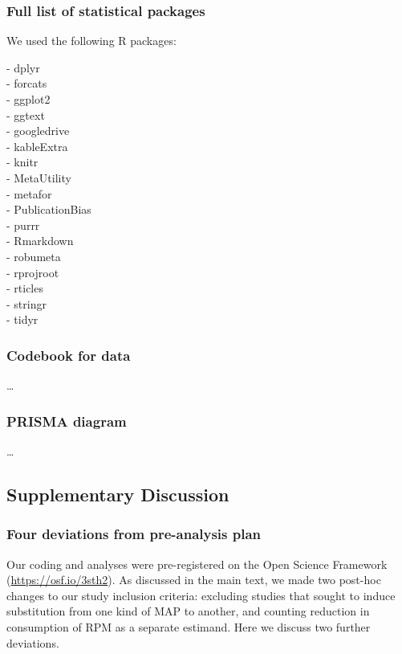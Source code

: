 \documentclass[sn-nature,referee,pdflatex]{sn-jnl}
\begin{document}
\subsubsection{Full list of statistical
packages}\label{full-list-of-statistical-packages}

We used the following R packages:

- dplyr\\
- forcats\\
- ggplot2\\
- ggtext\\
- googledrive\\
- kableExtra\\
- knitr\\
- MetaUtility\\
- metafor\\
- PublicationBias\\
- purrr\\
- Rmarkdown\\
- robumeta\\
- rprojroot\\
- rticles\\
- stringr\\
- tidyr

\subsubsection{Codebook for data}\label{codebook-for-data}

\ldots{}

\subsubsection{PRISMA diagram}\label{prisma-diagram}

\ldots{}

\subsection{Supplementary Discussion}\label{supplementary-discussion}

\subsubsection{Four deviations from pre-analysis
plan}\label{four-deviations-from-pre-analysis-plan}

Our coding and analyses were pre-registered on the Open Science
Framework (\url{https://osf.io/3sth2}). As discussed in the main text,
we made two post-hoc changes to our study inclusion criteria: excluding
studies that sought to induce substitution from one kind of MAP to
another, and counting reduction in consumption of RPM as a separate
estimand. Here we discuss two further deviations.
\end{document}
